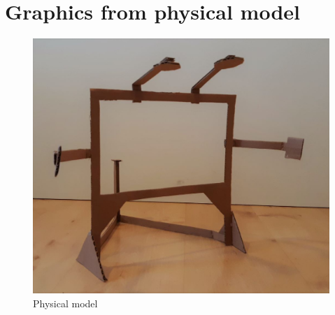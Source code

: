 \documentclass[a4paper]{jpconf}
\begin{document}
\section{Graphics from physical model}
\begin{figure}[H]
	\centering 
	\includegraphics[width=1\linewidth]{pappi_1.jpg}
	\caption{Physical model}
	\label{fig:pappi_1}
\end{figure}
\end{document}

